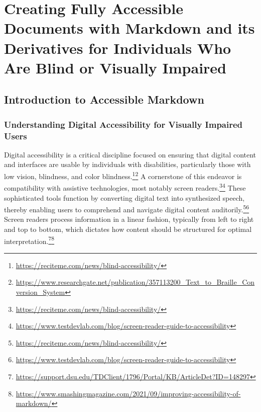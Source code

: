 \chapter{Creating Fully Accessible Documents with Markdown and its Derivatives for Individuals Who Are Blind or Visually Impaired}
\label{chap:accessible-markdown}

\section{Introduction to Accessible Markdown}
\label{sec:intro-accessible-markdown}

\subsection{Understanding Digital Accessibility for Visually Impaired Users}
Digital accessibility is a critical discipline focused on ensuring that digital content and interfaces are usable by individuals with disabilities, particularly those with low vision, blindness, and color blindness.\footnote{\url{https://reciteme.com/news/blind-accessibility/}}\footnote{\url{https://www.researchgate.net/publication/357113200_Text_to_Braille_Conversion_System}} A cornerstone of this endeavor is compatibility with assistive technologies, most notably screen readers.\footnote{\url{https://reciteme.com/news/blind-accessibility/}}\footnote{\url{https://www.testdevlab.com/blog/screen-reader-guide-to-accessibility}} These sophisticated tools function by converting digital text into synthesized speech, thereby enabling users to comprehend and navigate digital content auditorily.\footnote{\url{https://reciteme.com/news/blind-accessibility/}}\footnote{\url{https://www.testdevlab.com/blog/screen-reader-guide-to-accessibility}} Screen readers process information in a linear fashion, typically from left to right and top to bottom, which dictates how content should be structured for optimal interpretation.\footnote{\url{https://support.dsu.edu/TDClient/1796/Portal/KB/ArticleDet?ID=148297}}\footnote{\url{https://www.smashingmagazine.com/2021/09/improving-accessibility-of-markdown/}}

